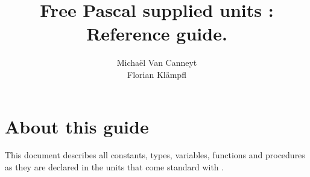 %
%
%
%
%

\begin{latexonly}
  \ifpdf
  \fi
\end{latexonly}

%
%
\makeindex
%
%
%
\usepackage{syntax}

%
%

%
\title{Free Pascal supplied units : \\ Reference guide.}

\author{Micha\"el Van Canneyt\\ Florian Kl\"ampfl}
\maketitle
\tableofcontents
\newpage

\section*{About this guide}
This document describes all constants, types, variables, functions and
procedures as they are declared in the units that come standard with \fpc.


